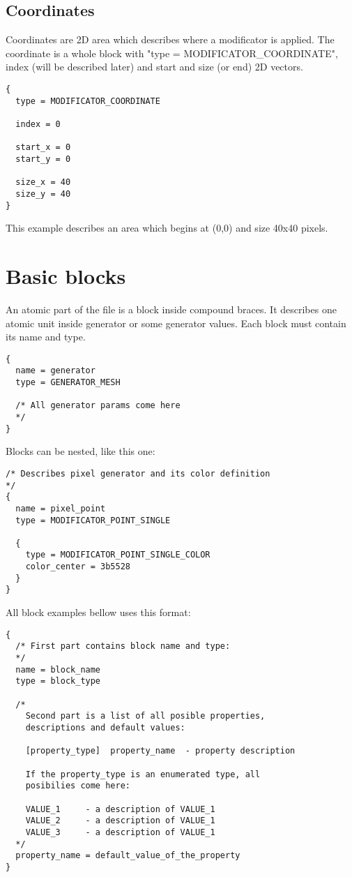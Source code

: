 \documentclass[11pt]{article}
\begin{document}
\subsection{Coordinates}

Coordinates are 2D area which describes 
where a modificator is applied.  The coordinate is a whole 
block with "type = MODIFICATOR\_COORDINATE", index (will be described later)
and start and size (or end) 2D vectors.

\begin{verbatim}
{
  type = MODIFICATOR_COORDINATE

  index = 0

  start_x = 0
  start_y = 0

  size_x = 40
  size_y = 40
}
\end{verbatim}

This example describes an area which begins at (0,0) and size 40x40 pixels.

\section{Basic blocks}

An atomic part of the file is a block inside compound braces. It describes one 
atomic unit inside generator or some generator values. Each block must
contain its name and type.

\begin{verbatim}
{
  name = generator
  type = GENERATOR_MESH

  /* All generator params come here
  */
}
\end{verbatim}

Blocks can be nested, like this one:

\begin{verbatim}
/* Describes pixel generator and its color definition
*/
{
  name = pixel_point
  type = MODIFICATOR_POINT_SINGLE

  {
    type = MODIFICATOR_POINT_SINGLE_COLOR
    color_center = 3b5528
  }
}
\end{verbatim}

All block examples bellow uses this format:

\begin{verbatim}
{
  /* First part contains block name and type:
  */
  name = block_name
  type = block_type

  /*
    Second part is a list of all posible properties,
    descriptions and default values:

    [property_type]  property_name  - property description
   
    If the property_type is an enumerated type, all 
    posibilies come here:
    
    VALUE_1     - a description of VALUE_1
    VALUE_2     - a description of VALUE_1
    VALUE_3     - a description of VALUE_1
  */  
  property_name = default_value_of_the_property  
}
\end{verbatim}
\end{document}
